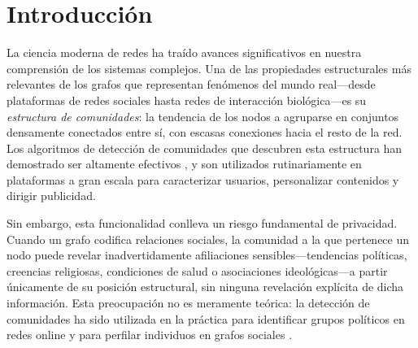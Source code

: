 \documentclass[11pt,a4paper,twoside]{tesis}
\begin{document}
\def\autor{Dante Culaciati}
\def\tituloTesis{Mejorando el Ocultamiento de Membres\'ia de Comunidades \vspace{.2cm} \\
                 mediante Aprendizaje Profundo por Refuerzo}
\def\runtitulo{Mejorando el Ocultamiento de Membres\'ia de Comunidades
               mediante Aprendizaje Profundo por Refuerzo}
\def\runtitle{Improving Community Membership Hiding via Deep Reinforcement Learning}
\def\director{Esteban Feuerstein}
\def\codirector{[Nombre del Codirector]}   %
\def\lugar{Buenos Aires, 2026}


\frontmatter
\pagestyle{empty}


\cleardoublepage


\cleardoublepage


\cleardoublepage


\cleardoublepage
\tableofcontents

\mainmatter
\pagestyle{headings}


\chapter{Introducción}
\label{ch:intro}

La ciencia moderna de redes ha traído avances significativos en nuestra comprensión de
los sistemas complejos. Una de las propiedades estructurales más relevantes de los grafos
que representan fenómenos del mundo real---desde plataformas de redes sociales hasta
redes de interacción biológica---es su \emph{estructura de comunidades}: la tendencia de
los nodos a agruparse en conjuntos densamente conectados entre sí, con escasas conexiones
hacia el resto de la red. Los algoritmos de detección de comunidades que descubren esta
estructura han demostrado ser altamente efectivos \cite{Fortunato-2010}, y son utilizados
rutinariamente en plataformas a gran escala para caracterizar usuarios, personalizar
contenidos y dirigir publicidad.

Sin embargo, esta funcionalidad conlleva un riesgo fundamental de privacidad. Cuando un
grafo codifica relaciones sociales, la comunidad a la que pertenece un nodo puede revelar
inadvertidamente afiliaciones sensibles---tendencias políticas, creencias religiosas,
condiciones de salud o asociaciones ideológicas---a partir únicamente de su posición
estructural, sin ninguna revelación explícita de dicha información. Esta preocupación no
es meramente teórica: la detección de comunidades ha sido utilizada en la práctica para
identificar grupos políticos en redes online \cite{narayanan2009deanonymizing} y para
perfilar individuos en grafos sociales \cite{Fire2014privacynetworks}.
\end{document}
